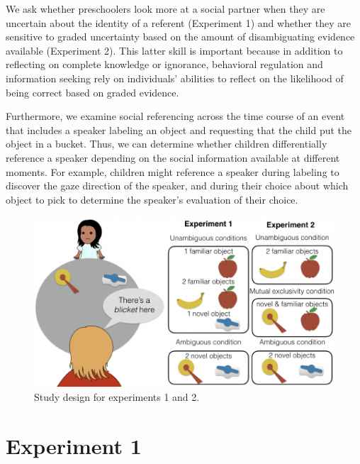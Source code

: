 \documentclass[a4paper,man,apacite,floatsintext]{apa6}
\newenvironment{CodeChunk}{}{}
\begin{document}
We ask whether preschoolers look more at a social partner when they are
uncertain about the identity of a referent (Experiment 1) and whether
they are sensitive to graded uncertainty based on the amount of
disambiguating evidence available (Experiment 2). This latter skill is
important because in addition to reflecting on complete knowledge or
ignorance, behavioral regulation and information seeking rely on
individuals' abilities to reflect on the likelihood of being correct
based on graded evidence.

Furthermore, we examine social referencing across the time course of an
event that includes a speaker labeling an object and requesting that the
child put the object in a bucket. Thus, we can determine whether
children differentially reference a speaker depending on the social
information available at different moments. For example, children might
reference a speaker during labeling to discover the gaze direction of
the speaker, and during their choice about which object to pick to
determine the speaker's evaluation of their choice.

\begin{CodeChunk}
\begin{figure}[b]

{\centering \includegraphics{figs/design-1} 

}

\caption[Study design for experiments 1 and 2]{Study design for experiments 1 and 2.}\label{fig:design}
\end{figure}
\end{CodeChunk}

\section{Experiment 1}\label{experiment-1}
\end{document}
